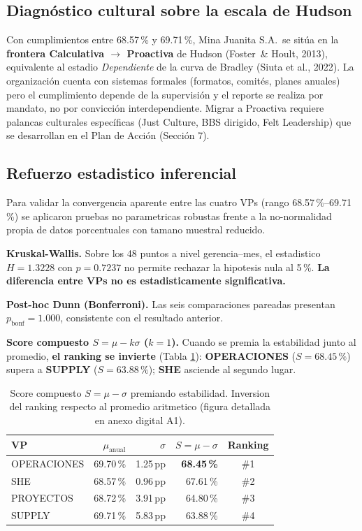 \documentclass[12pt,a4paper]{article}
\begin{document}
\subsection{Diagnóstico cultural sobre la escala de Hudson}

Con cumplimientos entre 68.57\,\% y 69.71\,\%, Mina Juanita S.A.\ se sitúa en la \textbf{frontera Calculativa $\to$ Proactiva} de Hudson (Foster~\& Hoult, 2013), equivalente al estadio \emph{Dependiente} de la curva de Bradley (Siuta et al., 2022). La organización cuenta con sistemas formales (formatos, comités, planes anuales) pero el cumplimiento depende de la supervisión y el reporte se realiza por mandato, no por convicción interdependiente. Migrar a Proactiva requiere palancas culturales específicas (Just Culture, BBS dirigido, Felt Leadership) que se desarrollan en el Plan de Acción (Sección 7).

\subsection{Refuerzo estadistico inferencial}
\label{sec:inferencial}

Para validar la convergencia aparente entre las cuatro VPs (rango 68.57\,\%--69.71\,\%) se aplicaron pruebas no parametricas robustas frente a la no-normalidad propia de datos porcentuales con tamano muestral reducido.

\textbf{Kruskal-Wallis.} Sobre los 48 puntos a nivel gerencia--mes, el estadistico $H = 1.3228$ con $p = 0.7237$ no permite rechazar la hipotesis nula al 5\,\%. \textbf{La diferencia entre VPs no es estadisticamente significativa.}

\textbf{Post-hoc Dunn (Bonferroni).} Las seis comparaciones pareadas presentan $p_{\text{bonf}} = 1.000$, consistente con el resultado anterior.

\textbf{Score compuesto $S = \mu - k\sigma$ ($k=1$).} Cuando se premia la estabilidad junto al promedio, \textbf{el ranking se invierte} (Tabla \ref{tab:score}): \textbf{OPERACIONES} ($S=68.45\,\%$) supera a \textbf{SUPPLY} ($S=63.88\,\%$); \textbf{SHE} asciende al segundo lugar.

\begin{table}[h]
\centering\footnotesize
\setlength{\tabcolsep}{6pt}
\begin{tabular}{lrrrc}
\toprule
\textbf{VP} & \textbf{$\mu_{\text{anual}}$} & \textbf{$\sigma$} & \textbf{$S=\mu-\sigma$} & \textbf{Ranking} \\
\midrule
OPERACIONES & 69.70\,\% & 1.25\,pp & \textbf{68.45\,\%} & \#1 \\
SHE         & 68.57\,\% & 0.96\,pp & 67.61\,\% & \#2 \\
PROYECTOS   & 68.72\,\% & 3.91\,pp & 64.80\,\% & \#3 \\
SUPPLY      & 69.71\,\% & 5.83\,pp & 63.88\,\% & \#4 \\
\bottomrule
\end{tabular}
\caption{Score compuesto $S = \mu - \sigma$ premiando estabilidad. Inversion del ranking respecto al promedio aritmetico (figura detallada en anexo digital A1).}
\label{tab:score}
\end{table}
\end{document}
